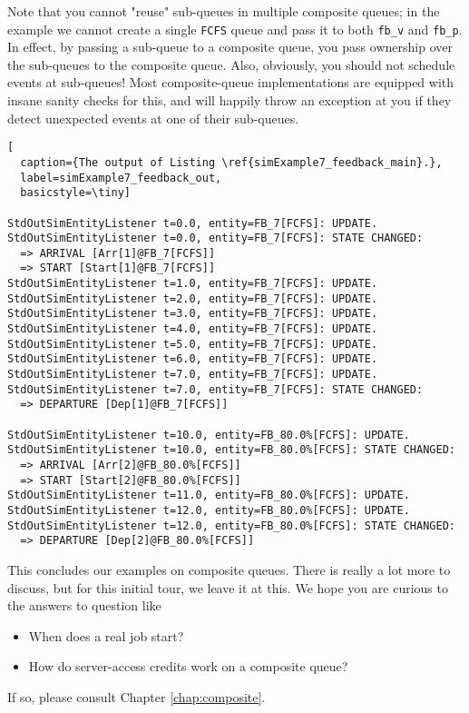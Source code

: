 Note that you cannot "reuse" sub-queues
  in multiple composite queues;
  in the example we cannot create a single
  \lstinline|FCFS| queue and pass it
  to both \lstinline|fb_v| and \lstinline|fb_p|.
In effect,
  by passing a sub-queue to a composite queue,
  you pass ownership over the sub-queues to the
  composite queue.
Also, obviously, you should not schedule events
  at sub-queues!
Most composite-queue implementations
  are equipped with insane sanity checks
  for this, and will happily throw
  an exception at you if they detect
  unexpected events at one of their sub-queues.

\begin{lstfloat}
\begin{lstlisting}[
  caption={The output of Listing \ref{simExample7_feedback_main}.},
  label=simExample7_feedback_out,
  basicstyle=\tiny]

StdOutSimEntityListener t=0.0, entity=FB_7[FCFS]: UPDATE.
StdOutSimEntityListener t=0.0, entity=FB_7[FCFS]: STATE CHANGED:
  => ARRIVAL [Arr[1]@FB_7[FCFS]]
  => START [Start[1]@FB_7[FCFS]]
StdOutSimEntityListener t=1.0, entity=FB_7[FCFS]: UPDATE.
StdOutSimEntityListener t=2.0, entity=FB_7[FCFS]: UPDATE.
StdOutSimEntityListener t=3.0, entity=FB_7[FCFS]: UPDATE.
StdOutSimEntityListener t=4.0, entity=FB_7[FCFS]: UPDATE.
StdOutSimEntityListener t=5.0, entity=FB_7[FCFS]: UPDATE.
StdOutSimEntityListener t=6.0, entity=FB_7[FCFS]: UPDATE.
StdOutSimEntityListener t=7.0, entity=FB_7[FCFS]: UPDATE.
StdOutSimEntityListener t=7.0, entity=FB_7[FCFS]: STATE CHANGED:
  => DEPARTURE [Dep[1]@FB_7[FCFS]]

StdOutSimEntityListener t=10.0, entity=FB_80.0%[FCFS]: UPDATE.
StdOutSimEntityListener t=10.0, entity=FB_80.0%[FCFS]: STATE CHANGED:
  => ARRIVAL [Arr[2]@FB_80.0%[FCFS]]
  => START [Start[2]@FB_80.0%[FCFS]]
StdOutSimEntityListener t=11.0, entity=FB_80.0%[FCFS]: UPDATE.
StdOutSimEntityListener t=12.0, entity=FB_80.0%[FCFS]: UPDATE.
StdOutSimEntityListener t=12.0, entity=FB_80.0%[FCFS]: STATE CHANGED:
  => DEPARTURE [Dep[2]@FB_80.0%[FCFS]]

\end{lstlisting}
\end{lstfloat}

This concludes our examples on composite queues.
There is really a lot more to discuss,
  but for this initial tour,
  we leave it at this.
We hope you are curious to the answers
  to question like
\begin{itemize}
  \item When does a real job start?
  \item How do server-access credits work on a composite queue?
\end{itemize}
If so, please consult Chapter \ref{chap:composite}.

